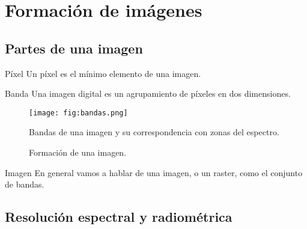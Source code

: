 \section{Formación de imágenes}
\subsection{Partes de una imagen}

\begin{frame}{}
\begin{block}{Píxel}
  Un píxel es el mínimo elemento de una imagen.
\end{block}\pause
\begin{block}{Banda}
  Una imagen digital es un agrupamiento de píxeles en dos dimensiones.
\end{block}
\end{frame}

\begin{frame}{}
  \begin{figure}
    \centering
    \texttt{[image: fig:bandas.png]}
    \caption{Bandas de una imagen y su correspondencia con zonas del espectro.}
    \label{}
  \end{figure}
\end{frame}

\begin{frame}{}
  \begin{figure}
    \centering
    \caption{Formación de una imagen.}
    \label{}
  \end{figure}
\end{frame}



\begin{frame}{}
  \begin{block}{Imagen}
    En general vamos a hablar de una imagen, o un raster, como el conjunto de bandas.
  \end{block}
\end{frame}

\subsection{Resolución espectral y radiométrica}

